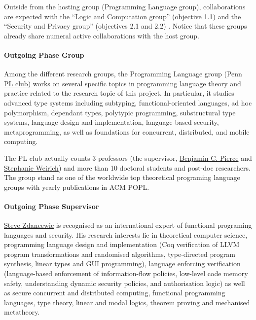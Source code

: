 \documentclass{article}[11pt]
\begin{document}
Outside from the hosting group (Programming Language group), collaborations are expected with the ``Logic and Computation group'' (objective 1.1) and the ``Security and Privacy group'' (objectives 2.1 and 2.2) . Notice that these groups already share numeral active collaborations with the host group.


\paragraph{Outgoing Phase Group}
Among the different research groups, the Programming Language group (Penn \href{http://www.cis.upenn.edu/~plclub/}{PL club})
works on several specific topics in programming language theory and practice related to the
research topic of this project. In particular, it studies advanced type systems including subtyping,
functional-oriented languages, ad hoc polymorphism, dependant types, polytypic programming, substructural type systems, language design and implementation, language-based security, metaprogramming, as well as
foundations for concurrent, distributed, and mobile computing. 

The PL club actually counts 3 professors (the supervisor, \href{http://www.cis.upenn.edu/~bcpierce/}{Benjamin C. Pierce} and  \href{http://www.cis.upenn.edu/~sweirich/}{Stephanie Weirich}) and more than 10 doctoral students and post-doc researchers. The group stand as one of the worldwide top theoretical programing language groups with yearly publications in ACM POPL.


\paragraph{Outgoing Phase Supervisor}
\href{http://www.cis.upenn.edu/~stevez/}{Steve Zdancewic} is recognised as an international expert of functional programing languages and security. His research interests lie in theoretical computer science, programming language design and implementation (Coq verification of LLVM program transformations and randomised algorithms, type-directed program synthesis, linear types and GUI programming), language enforcing verification (language-based enforcement of information-flow policies, low-level code memory safety, understanding dynamic security policies, and authorisation logic) as well as secure concurrent and distributed computing, functional programming languages, type theory, linear and modal logics, theorem proving and mechanised metatheory. 
\end{document}
